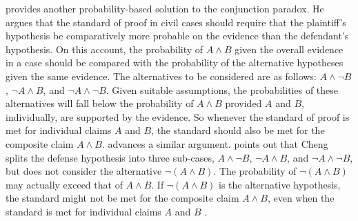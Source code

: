 \documentclass{article}
\begin{document}
%
 
 



\cite{cheng2012reconceptualizing} provides another probability-based solution to the conjunction paradox. He argues that the standard of proof in civil cases should require that the plaintiff's hypothesis be comparatively more probable on the evidence than the defendant's hypothesis. %
 On this account, the probability of $A\wedge B$ given the overall evidence in a case should be compared with the probability of the alternative hypotheses given the same evidence. The alternatives to be considered  are as follows: $A\wedge \neg B$, $\neg A \wedge B$, and $\neg A \wedge \neg B$. Given suitable assumptions, the probabilities of these alternatives will fall below the probability of $A\wedge B$ provided $A$ and $B$, individually, are supported by the evidence. So whenever the standard of proof is met for individual claims $A$ and $B$, the standard should also be met for the composite claim $A \wedge B$. \citet{kaplow2014likelihood} 
advances a similar argument.  
\citet{Urbaniak2019standards2} %
points out that Cheng splits the defense hypothesis into three sub-cases, $A\wedge \neg B$, $\neg A \wedge B$, and $\neg A \wedge \neg B$, but does not consider the  alternative $\neg (A \wedge B)$. 
 The probability of $\neg (A \wedge B)$ may actually exceed that of 
 $A\wedge B$. %
 If $\neg (A \wedge B)$ is the alternative hypothesis, the standard might not be met for the composite claim $A \wedge B$,   
 even when the standard is met for individual claims $A$ and $B$ \citep[for another critique of Cheng's approach, see][]{allen2013}.
 
\end{document}
